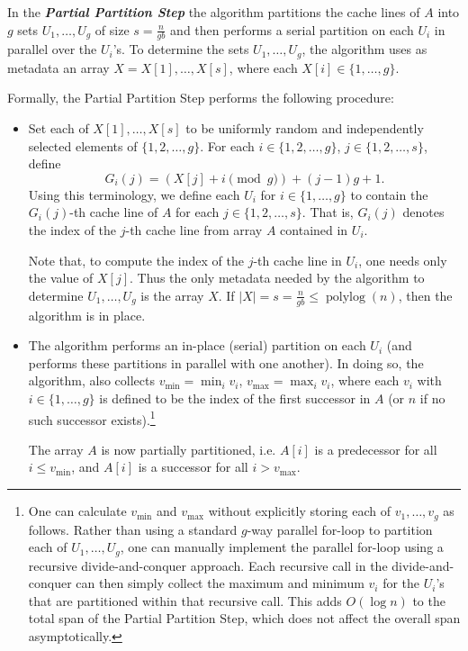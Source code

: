 \documentclass[sigconf, 10pt, nonacm]{acmart}
\newcommand{\defn}[1]{{\textit{\textbf{\boldmath #1}}}}
\theoremstyle{remark}
\theoremstyle{remark}
\begin{document}
In the \defn{Partial Partition Step} the algorithm partitions the
cache lines of $A$ into $g$ sets $U_1, \ldots, U_{g}$ of size
$s = \frac{n}{gb}$ and then performs a serial partition on each $U_i$
in parallel over the $U_i$'s. To determine the sets
$U_1, \ldots, U_{g}$, the algorithm uses as metadata an array
$X = X[1], \ldots, X[s]$, where each $X[i] \in \{1, \ldots,
g\}$. 

Formally, the Partial Partition Step performs the following procedure:
\begin{itemize}
\item Set each of $X[1], \ldots, X[s]$ to be uniformly random and
  independently selected elements of $\{1, 2, \ldots, g\}$. For each $i \in
  \{1, 2, \ldots, g\}$, $j \in \{1, 2, \ldots, s\}$, define
  $$G_i(j) = (X[j] + i \pmod g) + (j - 1)g + 1.$$ Using this
  terminology, we define each $U_i$ for $i \in \{1, \ldots, g\}$ to
  contain the $G_i(j)$-th cache line of $A$ for each $j \in \{1, 2,
  \ldots, s\}$. That is, $G_i(j)$ denotes the index of the $j$-th
  cache line from array $A$ contained in $U_i$.

  Note that, to compute the index of the $j$-th cache line in $U_i$,
  one needs only the value of $X[j]$. Thus the only metadata needed by
  the algorithm to determine $U_1, \ldots, U_g$ is the array
  $X$. If $|X| = s = \frac{n}{gb} \le \operatorname{polylog}(n)$, then
  the algorithm is in place.
  
\item The algorithm performs an in-place (serial) partition on each
  $U_i$ (and performs these partitions in parallel with one
  another). In doing so, the algorithm, also collects
  $v_{\text{min}}=\min_i{v_i}$, $v_{\text{max}}=\max_i{v_i}$, where
	each $v_i$ with $i \in \{1, \ldots, g\}$ is defined to be the index
  of the first successor in $A$ (or $n$ if no such successor
  exists).\footnote{One can calculate $v_{\text{min}}$ and
    $v_{\text{max}}$ without explicitly storing each of $v_1, \ldots,
		v_{g}$ as follows. Rather than using a standard $g$-way parallel
		for-loop to partition each of $U_1, \ldots, U_{g}$, one can
    manually implement the parallel for-loop using a recursive
    divide-and-conquer approach. Each recursive call in the
    divide-and-conquer can then simply collect the maximum and minimum
    $v_i$ for the $U_i$'s that are partitioned within that recursive
    call. This adds $O(\log n)$ to the total span of the Partial
    Partition Step, which does not affect the overall span
    asymptotically. %
  }
  
  The array $A$ is now partially partitioned, i.e. $A[i]$ is a
  predecessor for all $i \le v_{\text{min}}$, and $A[i]$ is a successor
  for all $i > v_{\text{max}}$.
\end{itemize}
\end{document}
